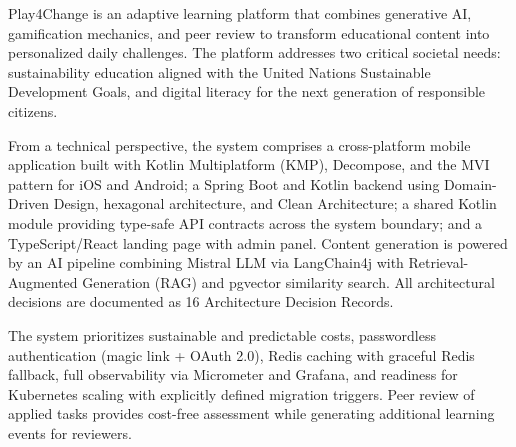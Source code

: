 \abstractEN %

Play4Change is an adaptive learning platform that combines generative AI, gamification mechanics, and peer review to transform educational content into personalized daily challenges. The platform addresses two critical societal needs: sustainability education aligned with the United Nations Sustainable Development Goals, and digital literacy for the next generation of responsible citizens.

From a technical perspective, the system comprises a cross-platform mobile application built with Kotlin Multiplatform (KMP), Decompose, and the MVI pattern for iOS and Android; a Spring Boot and Kotlin backend using Domain-Driven Design, hexagonal architecture, and Clean Architecture; a shared Kotlin module providing type-safe API contracts across the system boundary; and a TypeScript/React landing page with admin panel. Content generation is powered by an AI pipeline combining Mistral LLM via LangChain4j with Retrieval-Augmented Generation (RAG) and pgvector similarity search. All architectural decisions are documented as 16 Architecture Decision Records.

The system prioritizes sustainable and predictable costs, passwordless authentication (magic link + OAuth 2.0), Redis caching with graceful Redis fallback, full observability via Micrometer and Grafana, and readiness for Kubernetes scaling with explicitly defined migration triggers. Peer review of applied tasks provides cost-free assessment while generating additional learning events for reviewers.

